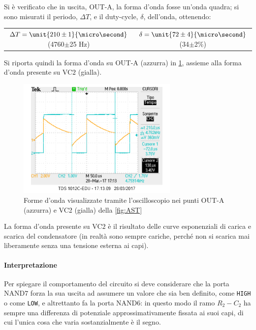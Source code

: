 \documentclass[a4paper,10pt]{article}
\def\code#1{\texttt{#1}}
\begin{document}
Si è verificato che in uscita, OUT-A, la forma d'onda fosse un'onda quadra; si sono misurati il periodo, $\Delta T$, e il duty-cycle, $\delta$, dell'onda, ottenendo:

\begin{table}[H]
	\centering
	\begin{tabular}{cc}
		$\Delta T = \unit{210 \pm 1}{\micro\second}$ (4760$\pm$25 Hz) & $\delta = \unit{72 \pm 4}{\micro\second}$ (34$\pm$2\%)\\
	\end{tabular}
\end{table}

Si riporta quindi la forma d'onda su OUT-A (azzurra) in \cref{fig:ASTosc}, assieme alla forma d'onda presente su VC$2$ (gialla).

\begin{figure}[H]
	\centering
	\includegraphics[width=0.7\textwidth]{../grafici/astabileOSC.png}
	\caption{Forme d'onda visualizzate tramite l'oscilloscopio nei punti OUT-A  (azzurra) e VC2 (gialla) della \cref{fig:AST}}
	\label{fig:ASTosc}
\end{figure}

La forma d'onda presente su VC$2$ è il risultato delle curve esponenziali di carica e scarica del condensatore (in realtà sono sempre cariche, perché non si scarica mai liberamente senza una tensione esterna ai capi).

\paragraph{Interpretazione} Per spiegare il comportamento del circuito si deve considerare che la porta NAND$7$ forza la sua uscita ad assumere un valore che sia ben definito, come \code{HIGH} o come \code{LOW}, e altrettanto fa la porta NAND$6$: in questo modo il ramo $R_2-C_2$ ha sempre una differenza di potenziale approssimativamente fissata ai suoi capi, di cui l'unica cosa che varia sostanzialmente è il segno.
\end{document}
